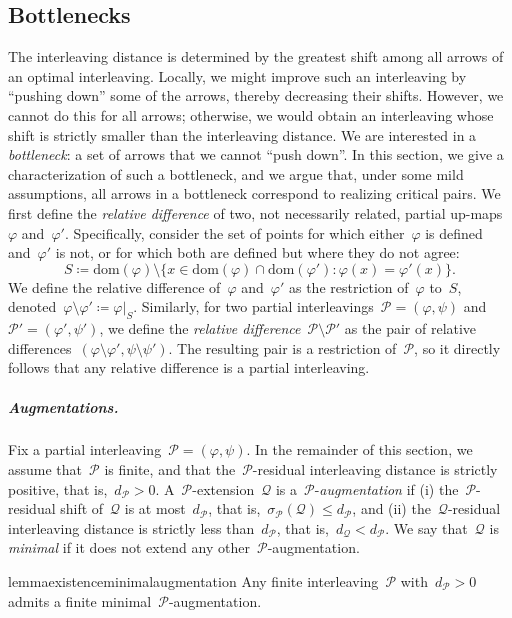 \documentclass[11pt]{article}
\newcommand{\dom}{\mathrm{dom}}
\newcommand{\shift}[1]{\sigma_{#1}}
\newcommand{\resdist}[1]{d_{#1}}
\renewcommand{\phi}{\varphi}
\renewcommand{\P}{\mathcal{P}}
\newcommand{\Q}{\mathcal{Q}}
\renewcommand{\mid}{:}
\begin{document}
\subsection{Bottlenecks}\label{sec:bottlenecks}
The interleaving distance is determined by the greatest shift among all arrows of an optimal interleaving.
Locally, we might improve such an interleaving by ``pushing down'' some of the arrows, thereby decreasing their shifts. 
However, we cannot do this for all arrows; otherwise, we would obtain an interleaving whose shift is strictly smaller than the interleaving distance.
We are interested in a \emph{bottleneck}: a set of arrows that we cannot ``push down''.
In this section, we give a characterization of such a bottleneck, and we argue that, under some mild assumptions, all arrows in a bottleneck correspond to realizing critical pairs.
%
We first define the \emph{relative difference} of two, not necessarily related, partial up-maps~$\phi$ and~$\phi'$.
Specifically, consider the set of points for which either~$\phi$ is defined and~$\phi'$ is not, or for which both are defined but where they do not agree:
\[
S \coloneqq \dom(\phi) \setminus \{x \in \dom(\phi) \cap \dom(\phi') \mid \phi(x) = \phi'(x)\}. 
\]
We define the relative difference of~$\phi$ and~$\phi'$ as the restriction of~$\phi$ to~$S$, denoted~${\phi \setminus \phi' \coloneqq \phi \vert_{S}}$.
Similarly, for two partial interleavings~$\P = (\phi, \psi)$ and~$\P' = (\phi', \psi')$, we define the \emph{relative difference}~$\P \setminus \P'$ as the pair of relative differences~$(\phi \setminus \phi', \psi \setminus \psi')$.
The resulting pair is a restriction of~$\P$, so it directly follows that any relative difference is a partial interleaving.
%
\subparagraph{Augmentations.}
Fix a partial interleaving~$\P = (\phi, \psi)$.
In the remainder of this section, we assume that~$\P$ is finite, and that the~$\P$-residual interleaving distance is strictly positive, that is,~$\resdist{\P}> 0$.
A~$\P$-extension~$\Q$ is a~$\P$-\emph{augmentation} if (i) the~$\P$-residual shift of~$\Q$ is at most~$\resdist{\P}$, that is,~$\shift{\P}(\Q) \le \resdist{\P} $, and (ii) the~$\Q$-residual interleaving distance is strictly less than~$\resdist{\P}$, that is,~$\resdist{\Q} < \resdist{\P}$.
We say that~$\Q$ is \emph{minimal} if it does not extend any other~$\P$-augmentation.
%
\begin{restatable}{lemma}{existenceminimalaugmentation}
\label{lem:existence-minimal-augmentation}
    Any finite interleaving~$\P$ with~$\resdist{\P} > 0$ admits a finite minimal~$\P$-augmentation.
\end{restatable}
\end{document}
